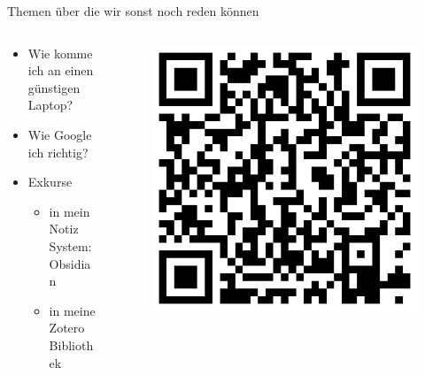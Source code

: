 \documentclass[aspectratio=169,shownotes]{beamer}
\begin{document}
\begin{frame}{Themen über die wir sonst noch reden können}
    \begin{columns}
        \begin{column}{0.6\textwidth}
            \begin{itemize}
                \item Wie komme ich an einen günstigen Laptop?
                \item Wie Google ich richtig?
                \item Exkurse
                \begin{itemize}
                    \item in mein Notiz System: Obsidian
                    \item in meine Zotero Bibliothek
                \end{itemize} 
            \end{itemize}
        \end{column}
        \begin{column}{0.4\textwidth}
            \begin{figure}
                \begin{flushleft}
                    \includegraphics[width=\textwidth,trim={0 0 0 0},clip]{graphics/QRCode.png}
                \end{flushleft}                
            \end{figure}               
        \end{column}
    \end{columns}
\end{frame}

\end{document}
